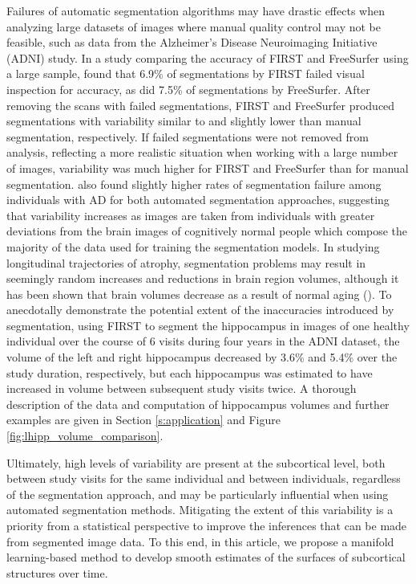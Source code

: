 \documentclass[11pt,reqno]{article}
\theoremstyle{definition}
\begin{document}
Failures of automatic segmentation algorithms may have drastic effects when analyzing large datasets of images where manual quality control may not be feasible, such as data from the Alzheimer's Disease Neuroimaging Initiative (ADNI) study. In a study comparing the accuracy of FIRST and FreeSurfer using a large sample, \cite{mulderHippocampalVolumeChange2014} found that 6.9\% of segmentations by FIRST failed visual inspection for accuracy, as did 7.5\% of segmentations by FreeSurfer. After removing the scans with failed segmentations, FIRST and FreeSurfer produced segmentations with variability similar to and slightly lower than manual segmentation, respectively. If failed segmentations were not removed from analysis, reflecting a more realistic situation when working with a large number of images, variability was much higher for FIRST and FreeSurfer than for manual segmentation. \cite{mulderHippocampalVolumeChange2014} also found slightly higher rates of segmentation failure among individuals with AD for both automated segmentation approaches, suggesting that variability increases as images are taken from individuals with greater deviations from the brain images of cognitively normal people which compose the majority of the data used for training the segmentation models. In studying longitudinal trajectories of atrophy, segmentation problems may result in seemingly random increases and reductions in brain region volumes, although it has been shown that brain volumes decrease as a result of normal aging (\cite{scahill2003longitudinal}). To anecdotally demonstrate the potential extent of the inaccuracies introduced by segmentation, using FIRST to segment the hippocampus in images of one healthy individual over the course of 6 visits during four years in the ADNI dataset, the volume of the left and right hippocampus decreased by 3.6\% and 5.4\% over the study duration, respectively, but each hippocampus was estimated to have increased in volume between subsequent study visits twice. A thorough description of the data and computation of hippocampus volumes and further examples are given in Section \ref{s:application} and Figure \ref{fig:lhipp_volume_comparison}.

Ultimately, high levels of variability are present at the subcortical level, both between study visits for the same individual and between individuals, regardless of the segmentation approach, and may be particularly influential when using automated segmentation methods. Mitigating the extent of this variability is a priority from a statistical perspective to improve the inferences that can be made from segmented image data. To this end, in this article, we propose a manifold learning-based method to develop smooth estimates of the surfaces of subcortical structures over time.
\end{document}
